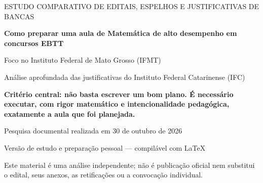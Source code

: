\documentclass[11pt,a4paper]{article}
\begin{document}
\begin{titlepage}
\centering
\vspace*{2.2cm}
{\large ESTUDO COMPARATIVO DE EDITAIS, ESPELHOS E JUSTIFICATIVAS DE BANCAS\par}
\vspace{.9cm}
{\Huge\bfseries\color{azul} Como preparar uma aula de Matemática de alto desempenho em concursos EBTT\par}
\vspace{.8cm}
{\LARGE Foco no Instituto Federal de Mato Grosso (IFMT)\par}
\vspace{.4cm}
{\Large Análise aprofundada das justificativas do Instituto Federal Catarinense (IFC)\par}
\vspace{1.3cm}
\begin{destaque}
\centering\large\textbf{Critério central: não basta escrever um bom plano. É necessário executar, com rigor matemático e intencionalidade pedagógica, exatamente a aula que foi planejada.}
\end{destaque}
\vfill
{\large Pesquisa documental realizada em 30 de outubro de 2026\par}
{\normalsize Versão de estudo e preparação pessoal --- compilável com \LaTeX\par}
\vspace{.6cm}
{\small Este material é uma análise independente; não é publicação oficial nem substitui o edital, seus anexos, as retificações ou a convocação individual.\par}
\end{titlepage}
\tableofcontents
\newpage
\end{document}
